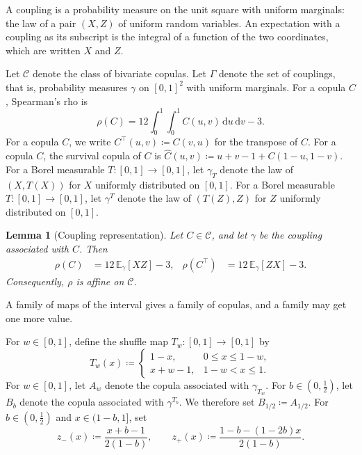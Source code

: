 \documentclass{article}
\newcommand{\E}{\mathbb{E}}
\newcommand{\CC}{\mathcal{C}}
\newcommand{\Gam}{\Gamma}
\newcommand{\de}{\,\mathrm{d}}
\newtheorem{lemma}[theorem]{Lemma}
\begin{document}
A coupling is a probability measure on the unit square with uniform marginals: the law of a pair $(X,Z)$ of uniform random variables.
An expectation with a coupling as its subscript is the integral of a function of the two coordinates, which are written $X$ and $Z$.

Let $\CC$ denote the class of bivariate copulas.
Let $\Gam$ denote the set of couplings, that is, probability measures $\gamma$ on $[0,1]^2$ with uniform marginals.
For a copula $C$, Spearman's rho is
\begin{equation}
  \rho(C)=12\int_0^1\!\int_0^1 C(u,v)\de u\de v-3.
\end{equation}
For a copula $C$, we write $C^\top(u,v)\coloneqq C(v,u)$ for the transpose of $C$.
For a copula $C$, the survival copula of $C$ is $\widehat C(u,v)\coloneqq u+v-1+C(1-u,1-v)$.
For a Borel measurable $T:[0,1]\to[0,1]$, let $\gamma_T$ denote the law of $(X,T(X))$ for $X$ uniformly distributed on $[0,1]$.
For a Borel measurable $T:[0,1]\to[0,1]$, let $\gamma^T$ denote the law of $(T(Z),Z)$ for $Z$ uniformly distributed on $[0,1]$.

\begin{lemma}[Coupling representation]
\label{lem:coupling}
Let $C\in\CC$, and let $\gamma$ be the coupling associated with $C$.
Then
\begin{equation}
  \begin{aligned}
  \rho(C)&=12\,\E_\gamma[XZ]-3,
  &\rho(C^\top)&=12\,\E_\gamma[ZX]-3.
  \end{aligned}
\end{equation}
Consequently, $\rho$ is affine on $\CC$.
\end{lemma}

A family of maps of the interval gives a family of copulas, and a family may get one more value.

For $w\in[0,1]$, define the shuffle map $T_w:[0,1]\to[0,1]$ by
\begin{equation}
  T_w(x)\coloneqq
  \begin{cases}
    1-x, & 0\le x\le1-w,\\
    x+w-1, & 1-w<x\le1.
  \end{cases}
\end{equation}
For $w\in[0,1]$, let $A_w$ denote the copula associated with $\gamma_{T_w}$.
For $b\in(0,\frac12)$, let $B_b$ denote the copula associated with $\gamma^{T_b}$.
We therefore set $B_{1/2}\coloneqq A_{1/2}$.
For $b\in(0,\frac12)$ and $x\in(1-b,1]$, set
\begin{equation}
  z_-(x)\coloneqq\frac{x+b-1}{2(1-b)},
  \qquad
  z_+(x)\coloneqq\frac{1-b-(1-2b)x}{2(1-b)}.
\end{equation}
\end{document}
